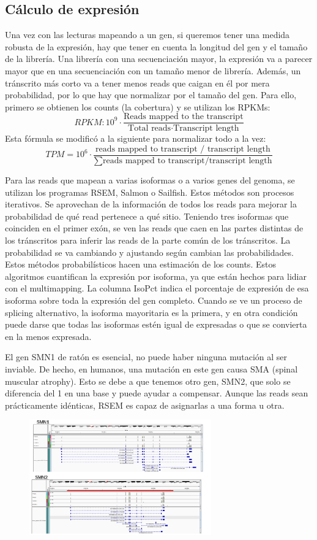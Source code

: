 \subsection{Cálculo de expresión}
Una vez con las lecturas mapeando a un gen, si queremos tener una medida robusta de la expresión, hay que tener en cuenta la longitud del gen y el tamaño de la librería. Una librería con una secuenciación mayor, la expresión va a parecer mayor que en una secuenciación con un tamaño menor de librería. Además, un tránscrito más corto va a tener menos reads que caigan en él por mera probabilidad, por lo que hay que normalizar por el tamaño del gen. Para ello, primero se obtienen los counts (la cobertura) y se utilizan los RPKMs:
$$RPKM: 10^9 \cdot \frac{\text{Reads mapped to the transcript}}{\text{Total reads} \cdot \text{Transcript length}}$$
Esta fórmula se modificó a la siguiente para normalizar todo a la vez:
$$TPM = 10^6 \cdot \frac{\text{reads mapped to transcript / transcript length}}{\sum \text{reads mapped to transcript/transcript length}}$$

Para las reads que mapean a varias isoformas o a varios genes del genoma, se utilizan los programas RSEM, Salmon o Sailfish. Estos métodos son procesos iterativos. Se aprovechan de la información de todos los reads para mejorar la probabilidad de qué read pertenece a qué sitio. Teniendo tres isoformas que coinciden en el primer exón, se ven las reads que caen en las partes distintas de los tránscritos para inferir las reads de la parte común de los tránscritos. La probabilidad se va cambiando y ajustando según cambian las probabilidades. Estos métodos probabilísticos hacen una estimación de los counts. Estos algoritmos cuantifican la expresión por isoforma, ya que están hechos para lidiar con el multimapping. La columna IsoPct indica el porcentaje de expresión de esa isoforma sobre toda la expresión del gen completo. Cuando se ve un proceso de splicing alternativo, la isoforma mayoritaria es la primera, y en otra condición puede darse que todas las isoformas estén igual de expresadas o que se convierta en la menos expresada.

El gen SMN1 de ratón es esencial, no puede haber ninguna mutación al ser inviable. De hecho, en humanos, una mutación en este gen causa SMA (spinal muscular atrophy). Esto se debe a que tenemos otro gen, SMN2, que solo se diferencia del 1 en una base y puede ayudar a compensar. Aunque las reads sean prácticamente idénticas, RSEM es capaz de asignarlas a una forma u otra.

\begin{figure}[h]
\centering
\includegraphics[width = 0.7\textwidth]{figs/smn12.png}
\end{figure}

